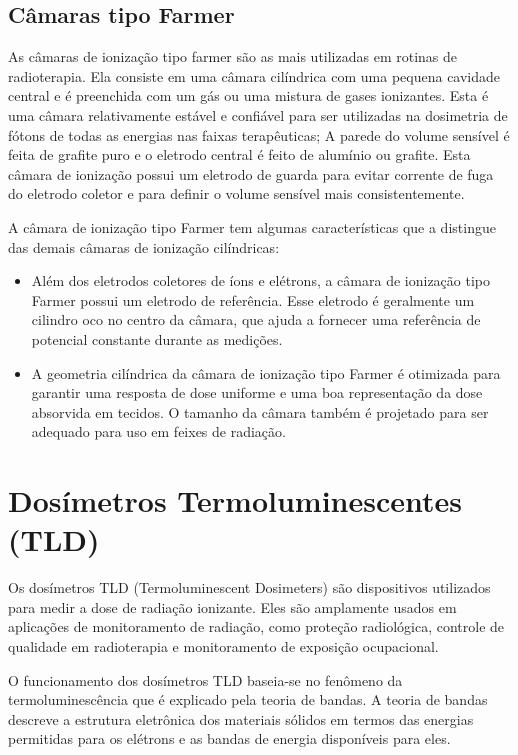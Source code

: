 \documentclass[11pt,a4paper]{article}
\begin{document}
	\subsection{Câmaras tipo Farmer}
		
		As câmaras de ionização tipo farmer são as mais utilizadas em rotinas de radioterapia. Ela consiste em uma câmara cilíndrica com uma pequena cavidade central e é preenchida com um gás ou uma mistura de gases ionizantes. Esta é uma câmara relativamente estável e confiável para ser utilizadas na dosimetria de fótons de todas as energias nas faixas terapêuticas; A parede do volume sensível é feita de grafite puro e o eletrodo central é feito de alumínio ou grafite. Esta câmara de ionização possui um eletrodo de guarda para evitar corrente de fuga do eletrodo coletor e para definir o volume sensível mais consistentemente.

		A câmara de ionização tipo Farmer tem algumas características que a distingue das demais câmaras de ionização cilíndricas:

		\begin{itemize}[label=\textcolor{CarnationPink}{$\blacktriangleright$}]
			\item Além dos eletrodos coletores de íons e elétrons, a câmara de ionização tipo Farmer possui um eletrodo de referência. Esse eletrodo é geralmente um cilindro oco no centro da câmara, que ajuda a fornecer uma referência de potencial constante durante as medições.
			\item A geometria cilíndrica da câmara de ionização tipo Farmer é otimizada para garantir uma resposta de dose uniforme e uma boa representação da dose absorvida em tecidos. O tamanho da câmara também é projetado para ser adequado para uso em feixes de radiação.
		\end{itemize}

	\section{Dosímetros Termoluminescentes (TLD)}

		Os dosímetros TLD (Termoluminescent Dosimeters) são dispositivos utilizados para medir a dose de radiação ionizante. Eles são amplamente usados em aplicações de monitoramento de radiação, como proteção radiológica, controle de qualidade em radioterapia e monitoramento de exposição ocupacional.

		O funcionamento dos dosímetros TLD baseia-se no fenômeno da termoluminescência que é explicado pela teoria de bandas. A teoria de bandas descreve a estrutura eletrônica dos materiais sólidos em termos das energias permitidas para os elétrons e as bandas de energia disponíveis para eles.
\end{document}
